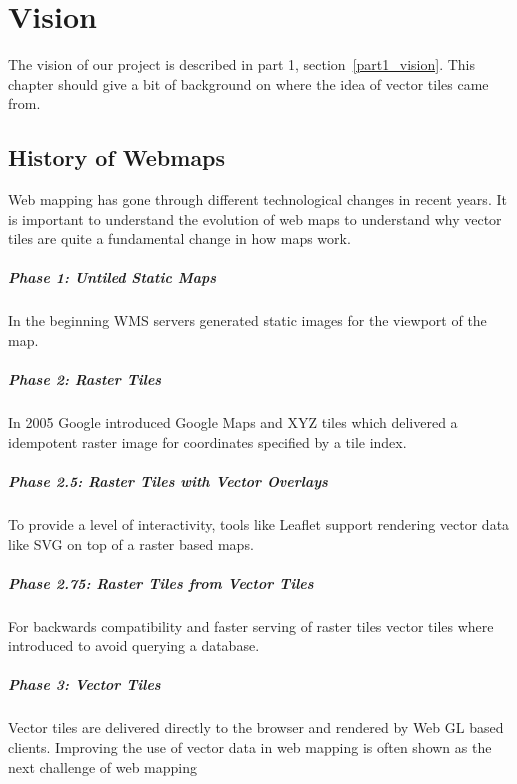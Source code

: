 \chapter{Vision}\label{vision}

The vision of our project is described in part 1, section~\ref{part1_vision}. This chapter should give a bit of background on where the idea of vector tiles came from.

\section{History of Webmaps}
\label{history-of-webmaps}

Web mapping has gone through different technological changes in recent years. It is important to understand the evolution of web maps to understand why vector tiles are quite a fundamental change in how maps work.

\paragraph{Phase 1: Untiled Static
Maps}

In the beginning WMS servers generated static images for the viewport
of the map.

\paragraph{Phase 2: Raster Tiles}

In 2005 Google introduced Google Maps and XYZ 
tiles\cite{v_1_wiki.openstreetmap.org_2015}
which delivered a idempotent raster image for coordinates specified by a
tile index.

\paragraph{Phase 2.5: Raster Tiles with Vector
Overlays}

To provide a level of interactivity, tools like
Leaflet\cite{v_2_leafletjs.com_2015} support rendering vector
data like SVG on top of a raster based maps.

\paragraph{Phase 2.75: Raster Tiles from Vector
Tiles}

For backwards compatibility and faster serving of raster tiles vector
tiles where introduced to avoid querying a database.

\paragraph{Phase 3: Vector Tiles}

Vector tiles are delivered directly to the browser and rendered by Web
GL based clients.
\newline{}
Improving the use of vector data in web mapping is often shown as the next challenge
of web mapping \cite[p.~88]{gaffuri2012toward} 
